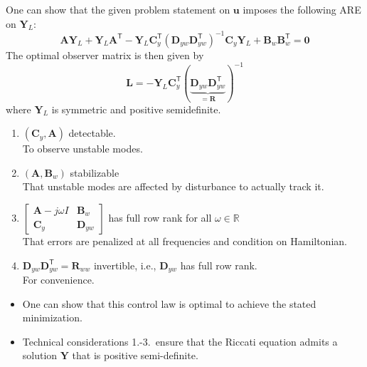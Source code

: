 \newpar{}

One can show that the given problem statement on $\mathbf{u}$ imposes the following ARE on $\mathbf{Y}_L$:
\begin{equation*}
    \mathbf{A}\mathbf{Y}_L + \mathbf{Y}_L \mathbf{A}^{\mathsf{T}} - \mathbf{Y}_L \mathbf{C}_y^{\mathsf{T}}{\left(\mathbf{D}_{yw}\mathbf{D}_{yw}^{\mathsf{T}}\right)}^{-1} \mathbf{C}_y \mathbf{Y}_L + \mathbf{B}_w\mathbf{B}_w^{\mathsf{T}} = \mathbf{0}
\end{equation*}
The optimal observer matrix is then given by
\begin{equation*}
    \mathbf{L} = -\mathbf{Y}_L\mathbf{C}_y^{\mathsf{T}}{(\underbrace{\mathbf{D}_{yw}\mathbf{D}_{yw}^{\mathsf{T}}}_{=\mathbf{R}})}^{-1}    
\end{equation*}
where $\mathbf{Y}_L$ is symmetric and positive semidefinite.

\newpar{}

\begin{enumerate}
    \item $(\mathbf{C}_y,\mathbf{A})$ detectable.\\
          To observe unstable modes.
    \item $(\mathbf{A},\mathbf{B}_w)$ stabilizable\\
          That unstable modes are affected by disturbance to actually track it.
    \item $\begin{bmatrix}\mathbf{A}-j\omega I&\mathbf{B}_w\\\mathbf{C}_y&\mathbf{D}_{yw}\end{bmatrix}$ has full row rank for all $\omega\in\mathbb{R}$\\
          That errors are penalized at all frequencies and condition on Hamiltonian.
    \item $\mathbf{D}_{yw} \mathbf{D}_{yw}^{\mathsf{T}}=\mathbf{R}_{ww}$ invertible, i.e., $\mathbf{D}_{yw}$ has full row rank.\\
          For convenience.
\end{enumerate}


\begin{itemize}
    \item One can show that this control law is optimal to achieve the stated minimization.
    \item Technical considerations 1.-3.\ ensure that the Riccati equation admits a solution $\mathbf{Y}$ that is positive semi-definite.
\end{itemize}

